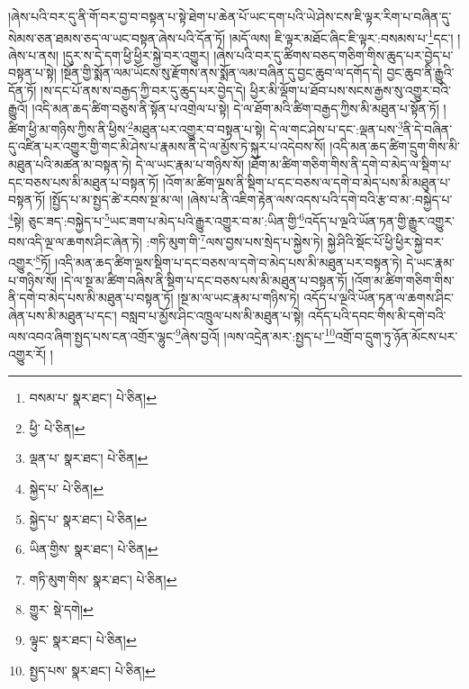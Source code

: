 །ཞེས་པའི་བར་དུ་ནི་གོ་བར་བྱ་བ་བསྟན་པ་སྟེ་ཐེག་པ་ཆེན་པོ་ཡང་དག་པའི་ཡེ་ཤེས་ངས་ཇི་ལྟར་རིག་པ་བཞིན་དུ་སེམས་ཅན་ཐམས་ཅད་ལ་ཡང་བསྟན་ཞེས་པའི་དོན་ཏོ། །མདོ་ལས། ཇི་ལྟར་མཐོང་ཞིང་ཇི་ལྟར་:བསམས་པ་\footnote{བསམ་པ་  སྣར་ཐང་།  པེ་ཅིན། }དང་། །ཞེས་པ་ནས། །དུར་ས་དེ་དག་ཕྱི་ཕྱིར་སྐྱེ་བར་འགྱུར། །ཞེས་པའི་བར་དུ་ཚིགས་བཅད་གཅིག་གིས་ཆུད་པར་བྱེད་པ་བསྟན་པ་སྟེ། །སྔོན་གྱི་སྨོན་ལམ་ཡོངས་སུ་རྫོགས་ནས་སྨོན་ལམ་བཞིན་དུ་བྱང་ཆུབ་ལ་དགོད་དེ། བྱང་ཆུབ་ནི་རྒྱུའི་དོན་ཏོ། །ས་དང་པོ་ནས་ས་བརྒྱད་ཀྱི་བར་དུ་ཆུད་པར་བྱེད་དེ། ཕྱིར་མི་ལྡོག་པ་ཐོབ་པས་སངས་རྒྱས་སུ་འགྱུར་བའི་རྒྱུའོ། །འདི་མན་ཆད་ཚིག་བཅུས་ནི་སྟོན་པ་འགྲེལ་པ་སྟེ། དེ་ལ་ཐོག་མའི་ཚིག་བརྒྱད་ཀྱིས་མི་མཐུན་པ་སྟོན་ཏོ། །ཚིག་ཕྱི་མ་གཉིས་ཀྱིས་ནི་ཕྱིས་\footnote{ཕྱི་  པེ་ཅིན། }མཐུན་པར་འགྱུར་བ་བསྟན་པ་སྟེ། དེ་ལ་གང་ཤེས་པ་དང་:ལྡན་པས་\footnote{ལྡན་པ་  སྣར་ཐང་།  པེ་ཅིན། }ནི་དེ་བཞིན་དུ་འཛིན་པར་འགྱུར་གྱི་གང་མི་ཤེས་པ་རྣམས་ནི་དེ་ལ་མྱོས་ཏེ་སྐུར་པ་འདེབས་སོ། །འདི་མན་ཆད་ཚིག་དྲུག་གིས་མི་མཐུན་པའི་མཚན་མ་བསྟན་ཏེ། དེ་ལ་ཡང་རྣམ་པ་གཉིས་སོ། །ཐོག་མ་ཚིག་གཅིག་གིས་ནི་དགེ་བ་མེད་ལ་སྡིག་པ་དང་བཅས་པས་མི་མཐུན་པ་བསྟན་ཏོ། །འོག་མ་ཚིག་ལྔས་ནི་སྡིག་པ་དང་བཅས་ལ་དགེ་བ་མེད་པས་མི་མཐུན་པ་བསྟན་ཏོ། །སྤྱོད་པ་མ་སྤྱད་ཚེ་རབས་སྔ་མ་ལ། །ཞེས་པ་ནི་འཇིག་རྟེན་ལས་འདས་པའི་དགེ་བའི་རྩ་བ་མ་:བསྐྱེད་པ་\footnote{སྐྱེད་པ་  པེ་ཅིན། }སྟེ། ཅུང་ཟད་:བསྐྱེད་པ་\footnote{སྐྱེད་པ་  སྣར་ཐང་།  པེ་ཅིན། }ཡང་ཟག་པ་མེད་པའི་རྒྱུར་འགྱུར་བ་མ་:ཡིན་གྱི་\footnote{ཡིན་གྱིས་  སྣར་ཐང་།  པེ་ཅིན། }འདོད་པ་ལྔའི་ཡོན་ཏན་གྱི་རྒྱུར་འགྱུར་བས་འདི་ལྔ་ལ་ཆགས་ཤིང་ཞེན་ཏེ། :གཏི་མུག་གི་\footnote{གཏི་མུག་གིས་  སྣར་ཐང་།  པེ་ཅིན། }ལས་བྱས་པས་སྲེད་པ་སྐྱེས་ཏེ། སྐྱེ་ཤིའི་སྡོང་པོ་ཕྱི་ཕྱིར་སྐྱེ་བར་འགྱུར་\footnote{གྱུར་  སྡེ་དགེ། }ཏོ། །འདི་མན་ཆད་ཚིག་ལྔས་སྡིག་པ་དང་བཅས་ལ་དགེ་བ་མེད་པས་མི་མཐུན་པར་བསྟན་ཏེ། དེ་ཡང་རྣམ་པ་གཉིས་སོ། །དེ་ལ་སྔ་མ་ཚིག་བཞིས་ནི་སྡིག་པ་དང་བཅས་པས་མི་མཐུན་པ་བསྟན་ཏོ། །འོག་མ་ཚིག་གཅིག་གིས་ནི་དགེ་བ་མེད་པས་མི་མཐུན་པ་བསྟན་ཏོ། །སྔ་མ་ལ་ཡང་རྣམ་པ་གཉིས་ཏེ། འདོད་པ་ལྔའི་ཡོན་ཏན་ལ་ཆགས་ཤིང་ཞེན་པས་མི་མཐུན་པ་དང་། བསླབ་པ་མྱོས་ཤིང་འཁྲུལ་པས་མི་མཐུན་པ་སྟེ། འདོད་པའི་དབང་གིས་མི་དགེ་བའི་ལས་འབའ་ཞིག་སྤྱད་པས་ངན་འགྲོར་ལྷུང་\footnote{ལྟུང་  སྣར་ཐང་།  པེ་ཅིན། }ཞེས་བྱའོ། །ལས་འདྲེན་མར་:སྤྱད་པ་\footnote{སྤྱད་པས་  སྣར་ཐང་།  པེ་ཅིན། }འགྲོ་བ་དྲུག་ཏུ་ཉོན་མོངས་པར་འགྱུར་རོ། །
